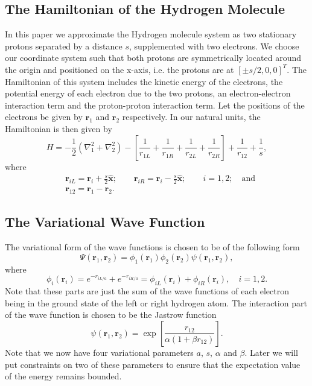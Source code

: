 \documentclass[twoside]{article}
\newcommand{\bfr}{\ensuremath{\mathbf{r}}}
\begin{document}
\subsection{The Hamiltonian of the Hydrogen Molecule}\label{sec:hamiltonian}
In this paper we approximate the Hydrogen molecule system as two stationary protons separated by a distance $s$, supplemented with two electrons. We choose our coordinate system such that both protons are symmetrically located around the origin and positioned on the x-axis, i.e. the protons are at $[\pm s/2,0,0]^T$. The Hamiltonian of this system includes the kinetic energy of the electrons, the potential energy of each electron due to the two protons, an electron-electron interaction term and the proton-proton interaction term. Let the positions of the electrons be given by $\bfr_1$ and $\bfr_2$ respectively. In our natural units, the Hamiltonian is then given by
\begin{equation}
H = -\frac{1}{2} (\nabla_1^2 + \nabla_2^2) - \left[ \frac{1}{r_{1L}} + \frac{1}{r_{1R}} + \frac{1}{r_{2L}} + \frac{1}{r_{2R}}  \right] + \frac{1}{r_{12}} + \frac{1}{s},
\end{equation}
where
\begin{equation}
\begin{split}
&\bfr_{iL} = \bfr_i + \frac{s}{2} \mathbf{\hat{x}}; \quad\quad \bfr_{iR} = \bfr_i - \frac{s}{2} \mathbf{\hat{x}}; \quad \quad i=1,2; \quad \mbox{and} \\
&\bfr_{12} = \bfr_1 - \bfr_2.
\end{split}
\end{equation}

\subsection{The Variational Wave Function}\label{sec:wavefunc}
The variational form of the wave functions is chosen to be of the following form
\begin{equation}
\Psi(\bfr_1,\bfr_2) = \phi_1(\bfr_1)\phi_2(\bfr_2)\psi(\bfr_1,\bfr_2),
\end{equation}
where 
\begin{equation}
\phi_i(\bfr_i) = e^{-r_{iL/a}} + e^{-r_{iR/a}} = \phi_{iL}(\bfr_i) + \phi_{iR}(\bfr_i), \quad i=1,2.
\end{equation}
Note that these parts are just the sum of the wave functions of each electron being in the ground state of the left or right hydrogen atom. The interaction part of the wave function is chosen to be the Jastrow function
\begin{equation}
\psi(\bfr_1,\bfr_2) = \exp\left[ \frac{r_{12}}{\alpha(1+\beta r_{12})} \right].
\end{equation}
Note that we now have four variational parameters $a$, $s$, $\alpha$ and $\beta$. Later we will put constraints on two of these parameters to ensure that the expectation value of the energy remains bounded.
\end{document}
